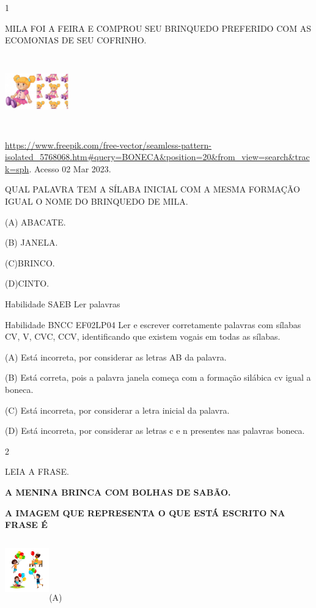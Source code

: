 {{\protect\hypertarget{_Hlk128577322}{}{}


\num{1}

MILA FOI A FEIRA E COMPROU SEU BRINQUEDO PREFERIDO COM AS ECOMONIAS DE
SEU COFRINHO.

\includegraphics[width=1.08889in,height=1.24236in]{media/image77.jpeg}

\url{https://www.freepik.com/free-vector/seamless-pattern-isolated_5768068.htm\#query=BONECA\&position=20\&from_view=search\&track=sph}.
Acesso 02 Mar 2023.

QUAL PALAVRA TEM A SÍLABA INICIAL COM A MESMA FORMAÇÃO IGUAL O NOME DO
BRINQUEDO DE MILA.

(A) ABACATE.

(B) JANELA.

(C)BRINCO.

(D)CINTO.

\protect\hypertarget{_Hlk128577378}{}{\protect\hypertarget{_Hlk128665495}{}{}}Habilidade
SAEB Ler palavras

Habilidade BNCC EF02LP04 Ler e escrever corretamente palavras com
sílabas CV, V, CVC, CCV, identificando que existem vogais em todas as
sílabas.

(A) Está incorreta, por considerar as letras AB da palavra.

(B) Está correta, pois a palavra janela começa com a formação silábica
cv igual a boneca.

(C) Está incorreta, por considerar a letra inicial da palavra.

(D) Está incorreta, por considerar as letras c e n presentes nas
palavras boneca.

\num{2}

LEIA A FRASE.

\textbf{A MENINA BRINCA COM BOLHAS DE SABÃO.}

\textbf{A IMAGEM QUE REPRESENTA O QUE ESTÁ ESCRITO NA FRASE É}

\includegraphics[width=0.75159in,height=1.04531in]{media/image78.jpeg}(A)

}}
